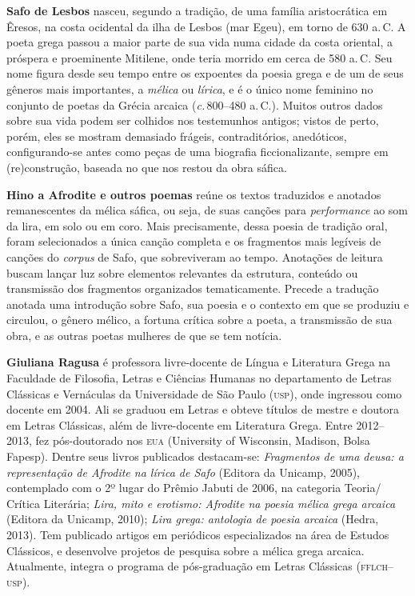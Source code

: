 \textbf{Safo de Lesbos} nasceu, segundo a tradição, de uma família aristocrática em Êresos, na costa ocidental da ilha de Lesbos (mar Egeu), em torno de 630 a.\,C. A poeta grega passou a maior parte de sua vida numa cidade da costa oriental, a próspera e proeminente Mitilene, onde teria morrido em cerca de 580 a.\,C. Seu nome figura desde seu tempo entre os expoentes da poesia grega e de um de seus gêneros mais importantes, a \textit{mélica} ou \textit{lírica}, e é o único nome feminino no conjunto de poetas da Grécia arcaica (\textit{c.}\,800--480 a.\,C.). Muitos outros dados sobre sua vida podem ser colhidos nos testemunhos antigos; vistos de perto, porém, eles se mostram demasiado frágeis, contraditórios, anedóticos, configurando-se antes como peças de uma biografia ficcionalizante, sempre em (re)construção, baseada no que nos restou da obra sáfica.

\textbf{Hino a Afrodite e outros poemas} reúne os textos traduzidos e anotados remanescentes da mélica sáfica, ou seja, de suas canções para \textit{performance} ao som da lira, em solo ou em coro. Mais precisamente, dessa poesia de tradição oral, foram selecionados a única canção completa e os fragmentos mais legíveis de canções do \textit{corpus} de Safo, que sobreviveram ao tempo. Anotações de leitura buscam lançar luz sobre elementos relevantes da estrutura, conteúdo ou transmissão dos fragmentos organizados tematicamente. Precede a tradução anotada uma introdução sobre Safo, sua poesia e o contexto em que se produziu e circulou, o gênero mélico, a fortuna crítica sobre a poeta, a transmissão de sua obra, e as outras poetas mulheres de que se tem notícia.

\textbf{Giuliana Ragusa} é professora livre-docente de Língua e Literatura Grega na Faculdade de Filosofia, Letras e Ciências Humanas no departamento de Letras Clássicas e Vernáculas da Universidade de São Paulo (\textsc{usp}), onde ingressou como docente em 2004. Ali se graduou em Letras e obteve títulos de mestre e doutora em Letras Clássicas, além de livre-docente em Literatura Grega. Entre 2012--2013, fez pós-doutorado nos \textsc{eua} (University of Wisconsin, Madison, Bolsa Fapesp). Dentre seus livros publicados destacam-se: \textit{Fragmentos de uma deusa: a representação de Afrodite na lírica de Safo} (Editora da Unicamp, 2005), contemplado com o 2º lugar do Prêmio Jabuti de 2006, na categoria Teoria/\,Crítica Literária; \textit{Lira, mito e erotismo: Afrodite na poesia mélica grega arcaica} (Editora da Unicamp, 2010); \textit{Lira grega: antologia de poesia arcaica} (Hedra, 2013). Tem publicado artigos em periódicos especializados na área de Estudos Clássicos, e desenvolve projetos de pesquisa sobre a mélica grega arcaica. Atualmente, integra o programa de pós-graduação em Letras Clássicas (\textsc{fflch--usp}).




